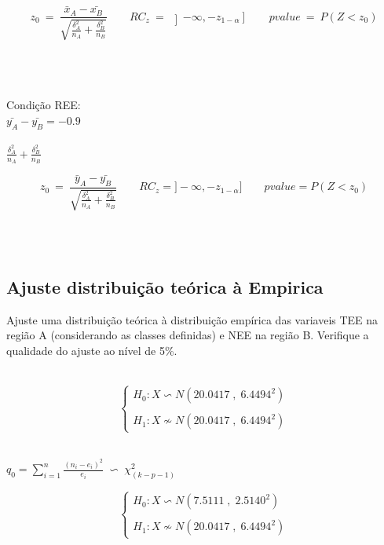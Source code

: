 \begin{minipage}[l]{0pt}
\[  z_0\:=\: \frac{\bar{x}_A-\bar{x_B}}{\sqrt{\frac{\delta_A^2}{n_A}+\frac{\delta_B^2}{n_B}}} \qquad
	RC_z \:=\: \left] -\infty,-z_{1-\alpha} \right]  \qquad
	pvalue \:=\: P(Z<z_0) \]
\end{minipage}\\
\\
\\
Condição REE:\\
$ \bar{y_A}-\bar{y_B}=-0.9$\\
\\
$ \frac{\delta_A^2}{n_A}+\frac{\delta_B^2}{n_B} $\\
\hspace{3cm}
\begin{minipage}[l]{0pt}
\[  z_0\:=\: \frac{\bar{y}_A-\bar{y_B}}{\sqrt{\frac{\delta_A^2}{n_A}+\frac{\delta_B^2}{n_B}}} \qquad
 	RC_z=]-\infty,-z_{1-\alpha}] \qquad
 	pvalue=P(Z<z_0) \]
\end{minipage}\\
\\










\newpage
\subsection{Ajuste distribuição teórica à Empirica}
Ajuste uma distribuição teórica à distribuição empírica das variaveis TEE na região A (considerando as classes definidas) e NEE na região B. Verifique a qualidade do ajuste ao nível de 5\%.\\
\\
\begin{minipage}[l]{0pt}
$$\left\lbrace\begin{array}{l}
H_0: X \backsim N (20.0417\;,\;6.4494^2) \\
\\
H_1: X \nsim N (20.0417\;,\;6.4494^2)
\end{array}\right.$$
\end{minipage}\\

$q_0=\sum_{i=1}^n \frac{(n_i-e_i)^2}{e_i} \;\backsim\; \chi_{(k-p-1)}^2$ \\





\begin{minipage}[l]{0pt}
$$\left\lbrace\begin{array}{l}
H_0: X \backsim N (7.5111\;,\;2.5140^2) \\
\\
H_1: X \nsim N (20.0417\;,\;6.4494^2)
\end{array}\right.$$
\end{minipage}\\










